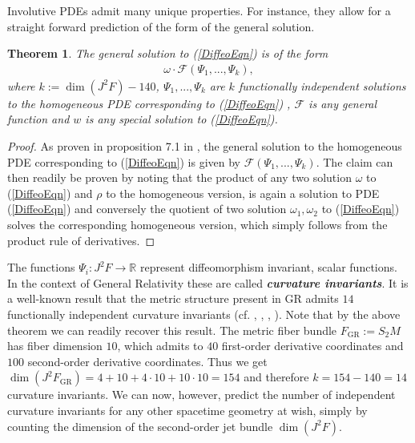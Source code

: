 \documentclass[%
preprint,
titlepage,
nofootinbib,
amsmath,amssymb,
showkeys,
aps,
prd,
floatfix,
]{revtex4-2}
\newtheorem{theorem}{Theorem}
\begin{document}
Involutive PDEs admit many unique properties. For instance, they allow for a straight forward prediction of the form of the general solution.
\begin{theorem}\label{FormalSol}
The general solution to (\ref{DiffeoEqn}) is of the form
\begin{align}
    \omega \cdot \mathcal{F} \left (\Psi_1,...,\Psi_k \right ),
\end{align}
where $k:= \operatorname{dim}(J^2F) - 140$,  $\Psi_1,...,\Psi_k$ are $k$ functionally independent solutions to the homogeneous PDE corresponding to (\ref{DiffeoEqn}) , $\mathcal{F}$ is any general function and $w$ is any special solution to (\ref{DiffeoEqn}).
\end{theorem}
\begin{proof}
As proven in proposition 7.1 in \cite{seiler1994analysis}, the general solution to the homogeneous PDE corresponding to (\ref{DiffeoEqn}) is given by $\mathcal{F} \left (\Psi_1,...,\Psi_k \right )$. The claim can then readily be proven by noting that the product of any two solution $\omega$ to (\ref{DiffeoEqn}) and $\rho$ to the homogeneous version, is again a solution to PDE (\ref{DiffeoEqn}) and conversely the quotient of two solution $\omega_1,\omega_2$ to (\ref{DiffeoEqn}) solves the corresponding homogeneous version, which simply follows from the product rule of derivatives. \end{proof}

The functions $\Psi_i: J^2F \rightarrow \mathbb{R}$ represent diffeomorphism invariant, scalar functions. In the context of General Relativity these are called \textit{\textbf{curvature invariants}}. It is a well-known result that the metric structure present in GR admits $14$ functionally independent curvature invariants (cf. \cite{2009CQGra..26b5013C}, \cite{Zakhary1997}, \cite{2002IJMPD..11..827C}, \cite{doi:10.1063/1.531425}). 
Note that by the above theorem we can readily recover this result. The metric fiber bundle $F_{\text{GR}}:=S_2M$ has fiber dimension $10$, which admits to $40$ first-order derivative coordinates and $100$ second-order derivative coordinates. Thus we get $\operatorname{dim}(J^2F_{\text{GR}}) = 4+10+4\cdot10+10\cdot10 = 154$ and therefore $k=154-140=14$ curvature invariants. 
We can now, however, predict the number of independent curvature invariants for any other spacetime geometry at wish, simply by counting the dimension of the second-order jet bundle $\operatorname{dim}(J^2F)$.
\end{document}
